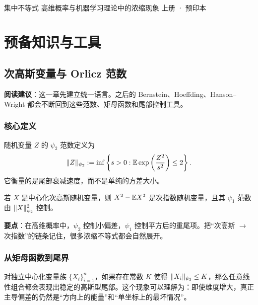 \documentclass[10pt,openany]{book}
\begin{document}
\MakeBookCoverUltraSimple
  {集中不等式}
  {高维概率与机器学习理论中的浓缩现象}
  {上册 · 预印本}

\frontmatter
\setcounter{tocdepth}{2}
\TOCwithoutHeadFoot

\mainmatter

\part{预备知识与工具}

\chapter{次高斯变量与 Orlicz 范数}

\begin{SideBar}
\textbf{阅读建议}：这一章先建立统一语言。之后的 Bernstein、Hoeffding、Hanson--Wright 都会不断回到这些范数、矩母函数和尾部控制工具。
\end{SideBar}

\section{核心定义}

\begin{definition}[Orlicz 范数]
随机变量 $Z$ 的 $\psi_2$ 范数定义为
\[
\lVert Z\rVert_{\psi_2} := \inf\left\{ s>0 : \mathbb{E} \exp\left(\frac{Z^2}{s^2}\right) \le 2 \right\}.
\]
它衡量的是尾部衰减速度，而不是单纯的方差大小。
\end{definition}

\begin{lemma}[次高斯平方的次指数性]
若 $X$ 是中心化次高斯随机变量，则 $X^2-\mathbb{E} X^2$ 是次指数随机变量，且其 $\psi_1$ 范数由 $\lVert X\rVert_{\psi_2}^2$ 控制。
\end{lemma}

\begin{KeyBox}
\textbf{要点}：在高维概率中，$\psi_2$ 控制小偏差，$\psi_1$ 控制平方后的重尾项。把“次高斯 $\to$ 次指数”的链条记住，很多浓缩不等式都会自然展开。
\end{KeyBox}

\section{从矩母函数到尾界}

对独立中心化变量族 $\{X_i\}_{i=1}^n$，如果存在常数 $K$ 使得 $\lVert X_i\rVert_{\psi_2}\le K$，那么任意线性组合都会表现出稳定的高斯型尾部。这个现象可以理解为：即使维度增大，真正主导偏差的仍然是“方向上的能量”和“单坐标上的最坏情况”。
\end{document}
